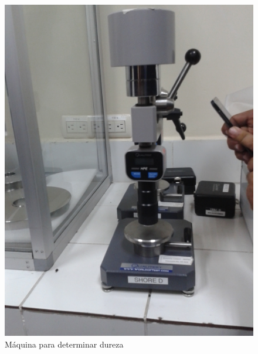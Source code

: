 \documentclass[a4paper, 11pt]{article}
\begin{document}
\begin{figure}[h!]
\begin{minipage}[t]{.45\textwidth}
\begin{center}
\includegraphics[scale=0.2]{dureza_shore.png}
\caption{Máquina para determinar dureza}
\label{dureza_shore}
\end{center}
\end{minipage}
\hfill
\end{figure}
\hfill
\newpage
\end{document}
